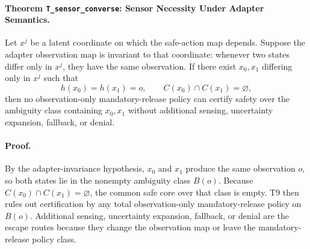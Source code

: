\paragraph{Theorem \texttt{T\_sensor\_converse}: Sensor Necessity Under Adapter Semantics.}
Let \(x^j\) be a latent coordinate on which the safe-action map depends. Suppose
the adapter observation map is invariant to that coordinate: whenever two states
differ only in \(x^j\), they have the same observation. If there exist
\(x_0,x_1\) differing only in \(x^j\) such that
\[
  h(x_0)=h(x_1)=o,
  \qquad
  C(x_0)\cap C(x_1)=\varnothing,
\]
then no observation-only mandatory-release policy can certify safety over the
ambiguity class containing \(x_0,x_1\) without additional sensing, uncertainty
expansion, fallback, or denial.

\paragraph{Proof.}
By the adapter-invariance hypothesis, \(x_0\) and \(x_1\) produce the same
observation \(o\), so both states lie in the nonempty ambiguity class
\(B(o)\). Because \(C(x_0)\cap C(x_1)=\varnothing\), the common safe core over
that class is empty. T9 then rules out certification by any total
observation-only mandatory-release policy on \(B(o)\). Additional sensing,
uncertainty expansion, fallback, or denial are the escape routes because they
change the observation map or leave the mandatory-release policy class.
